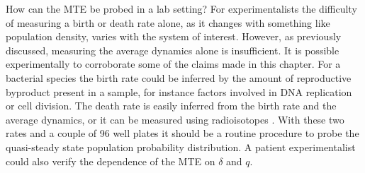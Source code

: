 How can the MTE be probed in a lab setting? 
For experimentalists the difficulty of measuring a birth or death rate alone, as it changes with something like population density, varies with the system of interest. 
However, as previously discussed, measuring the average dynamics alone is insufficient. 
It is possible experimentally to corroborate some of the claims made in this chapter. 
For a bacterial species the birth rate could be inferred by the amount of reproductive byproduct present in a sample, for instance factors involved in DNA replication or cell division. %
The death rate is easily inferred from the birth rate and the average dynamics, or it can be measured using radioisotopes \cite{Servais1985}. %
With these two rates and a couple of 96 well plates it should be a routine procedure to probe the quasi-steady state population probability distribution. 
A patient experimentalist could also verify the dependence of the MTE on $\delta$ and $q$.  %

